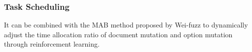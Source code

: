 \subsubsection{Task Scheduling} %
\iffalse
可結合Wei-fuzz \cite{tseng2023wei}所提出之 MAB 方法，透過強化學習，動態調整文件變異與選項變異的時間分配比例。
\else
It can be combined with the MAB method proposed by Wei-fuzz \cite{tseng2023wei} to dynamically adjust the time allocation ratio of document mutation and option mutation through reinforcement learning.
\fi

\fi